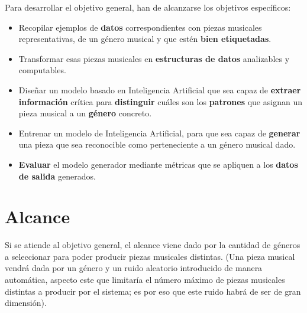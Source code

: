 Para desarrollar el objetivo general, han de alcanzarse los objetivos específicos:

\begin{itemize}
    \item Recopilar ejemplos de \textbf{datos} correspondientes con piezas musicales representativas, de un género musical y que estén \textbf{bien etiquetadas}.
    
    \item Transformar esas piezas musicales en \textbf{estructuras de datos} analizables y computables.

    \item Diseñar un modelo basado en Inteligencia Artificial que sea capaz de \textbf{extraer información} crítica para \textbf{distinguir} cuáles son los \textbf{patrones} que asignan un pieza musical a un \textbf{género} concreto.

    \item Entrenar un modelo de Inteligencia Artificial, para que sea capaz de \textbf{generar} una pieza que sea reconocible como perteneciente a un género musical dado.

    \item \textbf{Evaluar} el modelo generador mediante métricas que se apliquen a los \textbf{datos de salida} generados.
\end{itemize}

\section{Alcance}
Si se atiende al objetivo general, el alcance viene dado por la cantidad de géneros a seleccionar para poder producir piezas musicales distintas. (Una pieza musical vendrá dada por un género y un ruido aleatorio introducido de manera automática, aspecto este que limitaría el número máximo de piezas musicales distintas a producir por el sistema; es por eso que este ruido habrá de ser de gran dimensión).

